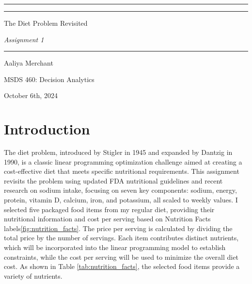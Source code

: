 \documentclass{article}
\begin{document}
\begin{titlepage}
        \begin{center}
        \rule{\textwidth}{0pt} %
	
	\vspace{2pt}\vspace{-\baselineskip} %
	
	\rule{\textwidth}{0pt} %
	\vspace{0.1\textheight} %
 
	{\Large The Diet Problem Revisited\par}
	{\Large \textit {Assignment 1}\par}
 \vspace{0.025\textheight} %
	
	\rule{0.3\textwidth}{0.4pt} %

\vfill
        {\large Aaliya Merchant \par}
        {\large MSDS 460: Decision Analytics\par}
	{\large October 6th, 2024\par}
        \end{center}
\end{titlepage}




\section{Introduction}
The diet problem, introduced by Stigler in 1945 and expanded by Dantzig in 1990, is a classic linear programming optimization challenge aimed at creating a cost-effective diet that meets specific nutritional requirements. This assignment revisits the problem using updated FDA nutritional guidelines and recent research on sodium intake, focusing on seven key components: sodium, energy, protein, vitamin D, calcium, iron, and potassium, all scaled to weekly values. I selected five packaged food items from my regular diet, providing their nutritional information and cost per serving based on Nutrition Facts labels\ref{fig:nutrition_facts}. The price per serving is calculated by dividing the total price by the number of servings. Each item contributes distinct nutrients, which will be incorporated into the linear programming model to establish constraints, while the cost per serving will be used to minimize the overall diet cost. As shown in Table \ref{tab:nutrition_facts}, the selected food items provide a variety of nutrients.
\end{document}
